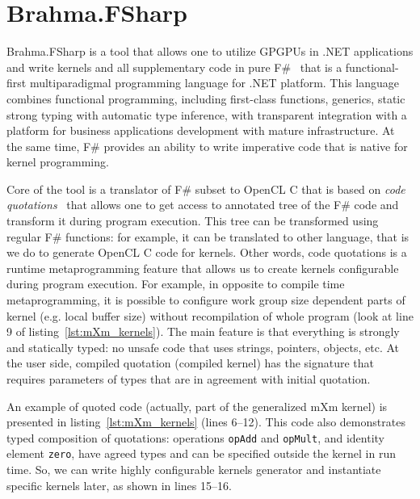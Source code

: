 \section{Brahma.FSharp}

Brahma.FSharp is a tool that allows one to utilize GPGPUs in .NET applications and write kernels and all supplementary code in pure F\#~\cite{fsharp} that is a functional-first multiparadigmal programming language for .NET platform.
This language combines functional programming, including first-class functions, generics, static strong typing with automatic type inference, with transparent integration with a platform for business applications development with mature infrastructure.
At the same time, F\# provides an ability to write imperative code that is native for kernel programming.

Core of the tool is a translator of F\# subset to OpenCL C that is based on \emph{code quotations}~\cite{FSharpQuotations} that allows one to get access to annotated tree of the F\# code and transform it during program execution.
This tree can be transformed using regular F\# functions: for example, it can be translated to other language, that is we do to generate OpenCL C code for kernels.
Other words, code quotations is a runtime metaprogramming feature that allows us to create kernels configurable during program execution.
For example, in opposite to compile time metaprogramming, it is possible to configure work group size dependent parts of kernel (e.g. local buffer size) without recompilation of whole program (look at line 9 of listing~\ref{lst:mXm_kernels}).
The main feature is that everything is strongly and statically typed: no unsafe code that uses strings, pointers, objects, etc.
At the user side, compiled quotation (compiled kernel) has the signature that requires parameters of types that are in agreement with initial quotation.

An example of quoted code (actually, part of the generalized mXm kernel) is presented in listing~\ref{lst:mXm_kernels} (lines 6--12).
This code also demonstrates typed composition of quotations: operations \verb|opAdd| and \verb|opMult|, and identity element \verb|zero|, have agreed types and can be specified outside the kernel in run time.
So, we can write highly configurable kernels generator and instantiate specific kernels later, as shown in lines 15--16.

